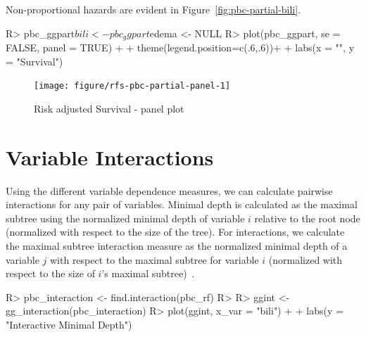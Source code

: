 \documentclass[nojss]{jss}\usepackage[]{graphicx}\usepackage[]{color}
\begin{document}
Non-proportional hazards are evident in Figure~\ref{fig:pbc-partial-bili}.


\begin{Schunk}
\begin{Sinput}
R> pbc_ggpart$bili <- pbc_ggpart$edema <- NULL
R> plot(pbc_ggpart, se = FALSE, panel = TRUE) + 
+   theme(legend.position=c(.6,.6))+
+  labs(x = "", y = "Survival")
\end{Sinput}
\begin{figure}[!htpb]

{\centering \texttt{[image: figure/rfs-pbc-partial-panel-1]} 

}

\caption[Risk adjusted Survival - panel plot]{Risk adjusted Survival - panel plot\label{fig:pbc-partial-panel}}
\end{figure}
\end{Schunk}


\section{Variable Interactions}\label{S:interactions}
Using the different variable dependence measures, we can calculate pairwise interactions for any pair of variables. Minimal depth is calculated as the maximal subtree using the normalized minimal depth of variable $i$ relative to the root node (normalized with respect to the size of the tree). For interactions, we calculate the maximal subtree interaction measure as the normalized minimal depth of a variable $j$ with respect to the maximal subtree for variable $i$ (normalized with respect to the size of $i$'s maximal subtree)~\citep{Ishwaran_HighDimension:2010,Ishwaran_HighDimension:2011}.

\begin{Schunk}
\begin{Sinput}
R> pbc_interaction <- find.interaction(pbc_rf)
R> 
R> ggint <- gg_interaction(pbc_interaction)
R> plot(ggint, x_var = "bili") + 
+  labs(y = "Interactive Minimal Depth")
\end{Sinput}
\end{Schunk}
\end{document}
